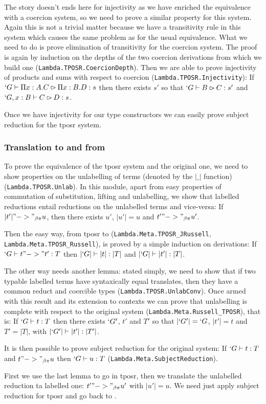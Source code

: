 \documentclass[11pt]{article}
\def\TPOSR{{\sc tposr}\xspace}
\def\coqmodule#1{\texttt{#1}}
\begin{document}
The story doesn't ends here for injectivity as we have enriched the
equivalence with a coercion system, so we need to prove a similar
property for this system. Again this is not a trivial matter because we
have a transitivity rule in this system which causes the same problem as
for the usual equivalence. What we need to do is prove elimination of
transitivity for the coercion system. The proof is again by induction on
the depths of the two coercion derivations from which we build one 
(\coqmodule{Lambda.TPOSR.CoercionDepth}).
Then we are able to prove injectivity of products and sums with respect
to coercion (\coqmodule{Lambda.TPOSR.Injectivity}):
If $`G \vdash \Pi x : A. C \rightslice \Pi x : B. D : s$ then there exists $s'$
so that $`G \vdash B \rightslice C : s'$ and $`G, x : B \vdash C \rightslice D : s$.

Once we have injectivity for our type constructors we can easily prove
subject reduction for the \TPOSR system.

\subsubsection*{Translation to and from \Russell}
To prove the equivalence of the \TPOSR system and the original one, we
need to show properties on the unlabelling of terms (denoted by the
$|\_|$ function) (\coqmodule{Lambda.TPOSR.Unlab}). In this module, apart from easy
properties of commutation of substitution, lifting and unlabelling,
we show that labelled reductions entail reductions on the unlabelled terms and vice-versa:
If $|t'| "->"_{\beta\pi} u$, then there exists $u'$, $|u'| = u$ and $t'
"->"_{\beta\pi} u'$. 

Then the easy way, from \TPOSR to \Russell
(\coqmodule{Lambda.Meta.TPOSR\_JRussell}, \coqmodule{Lambda.Meta.\-TPOSR\_Russell}), is proved by a simple induction
on derivations:
If $`G \vdash t "->" t' : T$ then $|`G| \vdash |t| : |T|$ and $|`G| \vdash |t'| : |T|$.

The other way needs another lemma: stated simply, we need to show
that if two typable labelled terms have syntaxically equal translates, then they
have a common reduct and coercible types
(\coqmodule{Lambda.TPOSR.UnlabConv}). Once armed with this result
and its extension to contexts we can prove that unlabelling is complete
with respect to the original system (\coqmodule{Lambda.Meta.Russell\_TPOSR}), that is:
If $`G \vdash t : T$ then there exists $`G'$, $t'$ and $T'$ so that
$|`G'| = `G$, $|t'| = t$ and $T' = |T|$, with $|`G'| \vdash |t'| : |T'|$.

It is then possible to prove subject reduction for the original system:
If $`G \vdash t : T$ and $t "->"_{\beta\pi} u$ then $`G \vdash u : T$ (\coqmodule{Lambda.Meta.SubjectReduction}).

First we use the last lemma to go in \TPOSR, then we translate the
unlabelled reduction ta labelled one: $t' "->"_{\beta\pi} u'$ with $|u'| = u$.
We need just apply subject reduction for \TPOSR and go back to \Russell.




\end{document}
